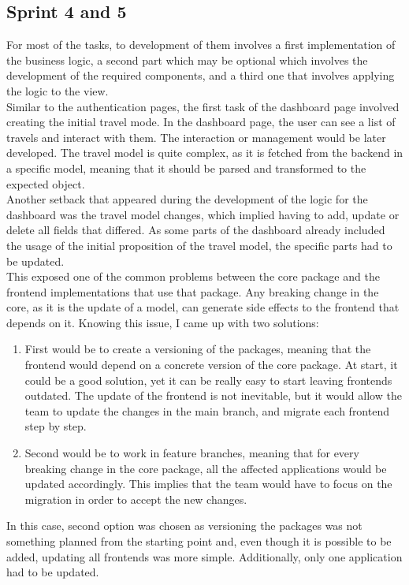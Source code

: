 \documentclass[../memory.tex]{subfiles}
\begin{document}
\subsection{Sprint 4 and 5}
For most of the tasks, to development of them involves a first implementation of
the business logic, a second part which may be optional which involves the
development of the required components, and a third one that involves applying
the logic to the view.
\\[8pt]
Similar to the authentication pages, the first task of the dashboard page
involved creating the initial travel mode. In the dashboard page, the user can
see a list of travels and interact with them. The interaction or management
would be later developed. The travel model is quite complex, as it is
fetched from the backend in a specific model, meaning that it should be parsed
and transformed to the expected object.
\\
Another setback that appeared during the development of the logic for the
dashboard was the travel model changes, which implied having to add, update or
delete all fields that differed. As some parts of the dashboard already included
the usage of the initial proposition of the travel model, the specific parts had
to be updated.
\\[8pt]
This exposed one of the common problems between the core package and the
frontend implementations that use that package. Any breaking change in the core,
as it is the update of a model, can generate side effects to the frontend that
depends on it. Knowing this issue, I came up with two solutions:
\begin{enumerate}
	\item First would be to create a versioning of the packages, meaning that the
	      frontend would depend on a concrete version of the core package. At
	      start, it could be a good solution, yet it can be really easy to start
	      leaving frontends outdated. The update of the frontend is not
	      inevitable, but it would allow the team to update the changes in the
	      main branch, and migrate each frontend step by step.
	\item Second would be to work in feature branches, meaning that for every
	      breaking change in the core package, all the affected applications would be
	      updated accordingly. This implies that the team would have to focus on the
	      migration in order to accept the new changes.
\end{enumerate}
In this case, second option was chosen as versioning the packages was not
something planned from the starting point and, even though it is possible to be
added, updating all frontends was more simple. Additionally, only one
application had to be updated.
\end{document}
